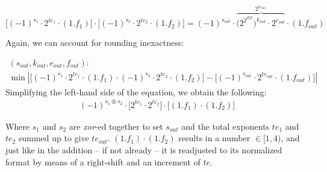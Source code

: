 \begin{equation}\label{equ:multiplication_equation_001}
    \big[ (-1)^{s_1} \cdot 2^{te_1} \cdot (1.f_1) \big] \cdot \big[ (-1)^{s_2} \cdot 2^{te_2} \cdot (1.f_2) \big] =(-1)^{s_{out}} \cdot \overbrace{\big(2^{2^{ES}}\big)^{k_{out}} \cdot 2^{e_{out}}}^{2^{te_{out}}} \cdot (1.f_{out})
\end{equation}

Again, we can account for rounding inexactness:

\begin{equation}
\begin{gathered}
    (s_{out}, k_{out}, e_{out}, f_{out}): \\
    \min \left| \big[ (-1)^{s_1} \cdot 2^{te_1} \cdot (1.f_1) \cdot (-1)^{s_2} \cdot 2^{te_2} \cdot (1.f_2) \big] - \big[ (-1)^{s_{out}} \cdot 2^{te_{out}} \cdot (1.f_{out}) \big] \right|
\end{gathered}
\end{equation}
Simplifying the left-hand side of the equation, we obtain the following:
\begin{equation}
\begin{gathered}
    (-1)^{s_1 \oplus s_2}  \cdot \big[ 2^{te_1} \cdot 2^{te_2} \big] \cdot \big[ (1.f_1) \cdot (1.f_2) \big]
\end{gathered}
\end{equation}

Where $s_1$ and $s_2$ are \textit{xor}-ed together to set $s_{out}$ and the total exponents $te_1$ and $te_2$ summed up to give $te_{out}$. 
$(1.f_1) \cdot (1.f_2)$ results in a number $\in [1, 4)$, and just like in the addition -- if not already -- it is readjusted to its normalized format by means of a right-shift and an increment of $te$.



